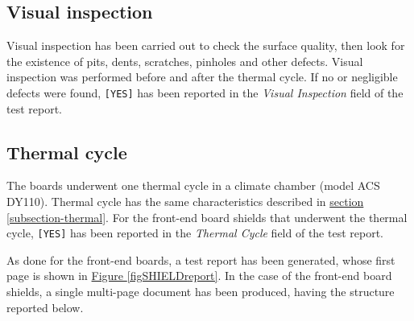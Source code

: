 \subsection{Visual inspection}
Visual inspection has been carried out to check the surface quality, then look for the existence of pits, dents, scratches, pinholes and other defects. Visual inspection was performed before and after the thermal cycle. If no or negligible defects were found, \texttt{[YES]} has been reported in the \textit{Visual Inspection} field of the test report.

\subsection{Thermal cycle}
The boards underwent one thermal cycle in a climate chamber (model ACS DY110). Thermal cycle has the same characteristics described in \hyperref[subsection-thermal]{section \ref{subsection-thermal}}. For the front-end board shields that underwent the thermal cycle, \texttt{[YES]} has been reported in the \textit{Thermal Cycle} field of the test report.

\par
As done for the front-end boards, a test report has been generated, whose first page is shown in \hyperref[figSHIELDreport]{Figure \ref{figSHIELDreport}}. In the case of the front-end board shields, a single multi-page document has been produced, having the structure reported below.

\begin{table}[ht]
    \centering
    \def\arraystretch{1.3}
    \caption{Structure of the entry for the front-end board shields test report.}
    \label{tabSHIELDstruct}
\end{table}
